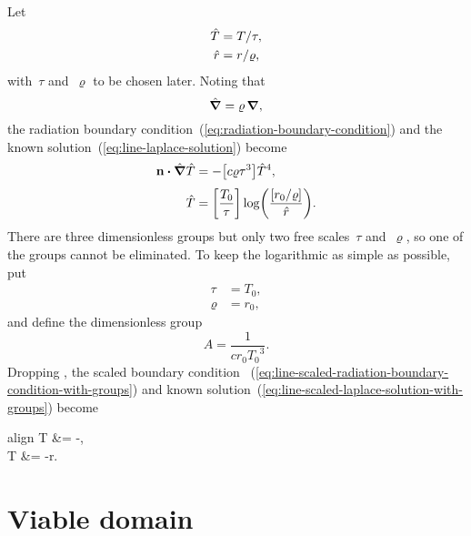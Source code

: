 Let
\begin{align}
  \hat{T} &= T / \tau, \label{eq:line-scaled-temperature} \\
  \hat{r} &= r / \varrho, \label{eq:line-scaled-r}
\end{align}
with~$\tau$ and~$\varrho$ to be chosen later.
Noting that
\begin{equation}
  \mathop{}\!\hat{\mathop{}\!\boldsymbol{\mathrm{\nabla}}} = \varrho \mathop{}\!\boldsymbol{\mathrm{\nabla}},
  \label{eq:line-scaled-del}
\end{equation}
the radiation boundary condition~(\ref{eq:radiation-boundary-condition})
and the known solution~(\ref{eq:line-laplace-solution})
become
\begin{align}
  \normalvec \dotp \scaleddel \scaled{T}
    &= -\squarebr*{c \varrho \tau^3} \scaled{T}^4,
    \label{eq:line-scaled-radiation-boundary-condition-with-groups}
    \\[\fraclinespace]
  \scaled{T}
    &=
      \squarebr*{\frac{T_0}{\tau}}
      \log \roundbr*{\frac{\squarebr{r_0 / \varrho}}{\scaled{r}}}.
    \label{eq:line-scaled-laplace-solution-with-groups}
\end{align}
There are three dimensionless groups
but only two free scales~$\tau$ and~$\varrho$,
so one of the groups cannot be eliminated.
To keep the logarithmic as simple as possible,
put
\begin{align}
  \tau &= T_0,
    \label{eq:line-temperature-scale} \\
  \varrho &= r_0,
    \label{eq:line-length-scale}
\end{align}
and define the dimensionless group
\begin{equation}
  A = \frac{1}{c r_0 {T_0}^3}.
  \label{eq:line-dimensionless-group}
\end{equation}
Dropping \scalingaccents, the scaled boundary condition~%
  (\ref{eq:line-scaled-radiation-boundary-condition-with-groups})
and known solution~(\ref{eq:line-scaled-laplace-solution-with-groups})
become
\begin{important}{align}
  \normalvec \dotp \del T &= -,
    \label{eq:line-scaled-radiation-boundary-condition} \\[\fraclinespace]
  T &= -\log r.
    \label{eq:line-scaled-laplace-solution}
\end{important}

\section{Viable domain}
\label{sec:polar.viable}

